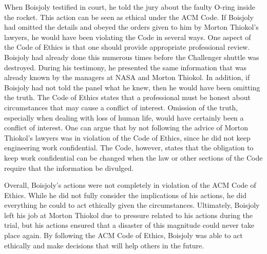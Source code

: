 \documentclass{paper}
\begin{document}
\begin{linenumbers}
When Boisjoly testified in court, he told the jury about the faulty O-ring inside the rocket. This action can be seen as ethical under the ACM Code. If Boisjoly had omitted the details and obeyed the orders given to him by Morton Thiokol's lawyers, he would have been violating the Code in several ways. One aspect of the Code of Ethics is that one should provide appropriate professional review. Boisjoly had already done this numerous times before the Challenger shuttle was destroyed. During his testimony, he presented the same information that was already known by the managers at NASA and Morton Thiokol. In addition, if Boisjoly had not told the panel what he knew, then he would have been omitting the truth. The Code of Ethics states that a professional must be honest about circumstances that may cause a conflict of interest. Omission of the truth, especially when dealing with loss of human life, would have certainly been a conflict of interest. One can argue that by not following the advice of Morton Thiokol's lawyers was in violation of the Code of Ethics, since he did not keep engineering work confidential. The Code, however, states that the obligation to keep work confidential can be changed when the law or other sections of the Code require that the information be divulged.

Overall, Boisjoly's actions were not completely in violation of the ACM Code of Ethics. While he did not fully consider the implications of his actions, he did everything he could to act ethically given the circumstances. Ultimately, Boisjoly left his job at Morton Thiokol due to pressure related to his actions during the trial, but his actions ensured that a disaster of this magnitude could never take place again. By following the ACM Code of Ethics, Boisjoly was able to act ethically and make decisions that will help others in the future.
\end{linenumbers}
\newpage

\nocite{*}
\printbibliography
\end{document}
